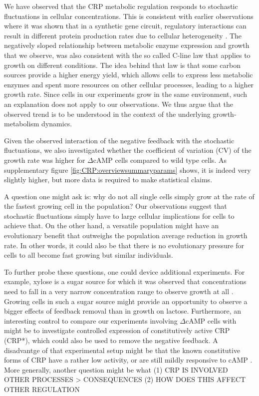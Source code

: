 We have observed that the CRP metabolic regulation responds to stochastic fluctuations in cellular concentrations.
%
This is consistent with earlier observations where it was shown that 
in a synthetic gene circuit, 
regulatory interactions can result in different protein production rates due to cellular heterogeneity \cite{Rosenfeld2005}.
%
The negatively sloped relationship between metabolic enzyme expression and growth that we observe, 
was also consistent with the so called C-line law \cite{You2013} that applies to growth on different conditions.
%
The idea behind that law is that some carbon sources provide a higher energy yield, which allows cells to express less metabolic enzymes and spent more resources on other cellular processes, leading to a higher growth rate.
%
Since cells in our experiments grow in the same environment, such an explanation does not apply to our observations.
%
We thus argue that the observed trend is to be understood in the context of the underlying growth-metabolism dynamics.

Given the observed interaction of the negative feedback with the stochastic fluctuations, 
we also investigated whether the coefficient of variation (CV) of the growth rate was higher for $\Delta$cAMP cells compared to wild type cells.
%
As supplementary figure \ref{fig:CRP:overviewsummaryparams} shows, it is indeed very slightly higher, but more data is required to make statistical claims.

A question one might ask is: why do not all single cells simply grow at the rate of the fastest growing cell in the population?
%
Our observations suggest that stochastic fluctuations simply have to large cellular implications for cells to achieve that.
%
On the other hand, a versatile population might have an evolutionary benefit that outweighs the population average reduction in growth rate.
%
In other words, it could also be that there is no evolutionary pressure for cells to all become fast growing but similar individuals.

To further probe these questions, one could device additional experiments.
%
For example, xylose is a sugar source for which it was observed that concentrations need to fall in a very narrow concentration range to observe growth at all \cite{Towbin2017personalcomm}. 
%
Growing cells in such a sugar source might provide an opportunity to observe a bigger effects of feedback removal than in growth on lactose.
%
Furthermore, an interesting control to compare our experiments involving $\Delta$cAMP cells with might be to investigate controlled expression of constitutively active CRP (CRP*), which could also be used to remove the negative feedback. A disadvantge of that experimental setup might be that the known constitutive forms of CRP have a rather low activity, or are still mildly responsive to cAMP \cite{Aiba1985, Garges1985}.
%
More generally, another question might be what 
(1) CRP IS INVOLVED OTHER PROCESSES > CONSEQUENCES
(2) HOW DOES THIS AFFECT OTHER REGULATION





